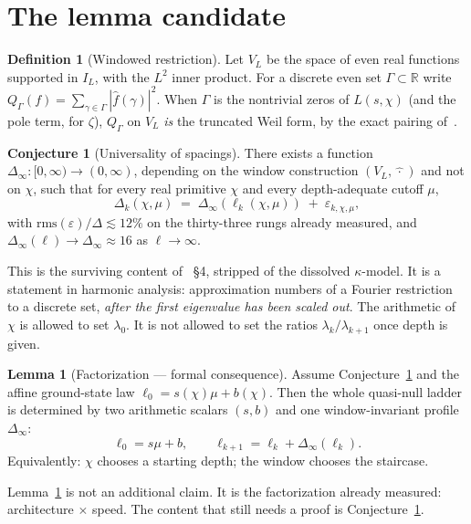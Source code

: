 \documentclass[10pt]{article}
\theoremstyle{definition}
\newtheorem{definition}{Definition}
\newtheorem{lemma}{Lemma}
\newtheorem{conjecture}{Conjecture}
\newcommand{\R}{\mathbb{R}}
\begin{document}
\section{The lemma candidate}

\begin{definition}[Windowed restriction]
Let $V_L$ be the space of even real functions supported in $I_L$,
with the $L^2$ inner product. For a discrete even set
$\Gamma\subset\R$ write
$Q_\Gamma(f)=\sum_{\gamma\in\Gamma}|\hat f(\gamma)|^2$.
When $\Gamma$ is the nontrivial zeros of $L(s,\chi)$ (and the pole
term, for $\zeta$), $Q_\Gamma$ on $V_L$ \emph{is} the truncated Weil
form, by the exact pairing of~\cite{Quorum}.
\end{definition}

\begin{conjecture}[Universality of spacings]\label{conj:univ}
There exists a function $\Delta_\infty:[0,\infty)\to(0,\infty)$,
depending on the window construction $(V_L,\widehat{\,\cdot\,})$ and
not on $\chi$, such that for every real primitive $\chi$ and every
depth-adequate cutoff $\mu$,
\[
\Delta_k(\chi,\mu)
\;=\;
\Delta_\infty(\ell_k(\chi,\mu)) \;+\; \varepsilon_{k,\chi,\mu},
\]
with $\mathrm{rms}(\varepsilon)/\Delta \lesssim 12\%$ on the thirty-three
rungs already measured, and $\Delta_\infty(\ell)\to\Delta_\infty\approx16$
as $\ell\to\infty$.
\end{conjecture}

This is the surviving content of~\cite{Depth} \S4, stripped of the
dissolved $\kappa$-model. It is a statement in harmonic analysis:
approximation numbers of a Fourier restriction to a discrete set,
\emph{after the first eigenvalue has been scaled out}. The arithmetic
of $\chi$ is allowed to set $\lambda_0$. It is not allowed to set the
ratios $\lambda_k/\lambda_{k+1}$ once depth is given.

\begin{lemma}[Factorization --- formal consequence]\label{lem:fact}
Assume Conjecture~\ref{conj:univ} and the affine ground-state law
$\ell_0=s(\chi)\mu+b(\chi)$. Then the whole quasi-null ladder is
determined by two arithmetic scalars $(s,b)$ and one window-invariant
profile $\Delta_\infty$:
\[
\ell_0=s\mu+b,\qquad
\ell_{k+1}=\ell_k+\Delta_\infty(\ell_k).
\]
Equivalently: $\chi$ chooses a starting depth; the window chooses the
staircase.
\end{lemma}

Lemma~\ref{lem:fact} is not an additional claim. It is the
factorization already measured: architecture $\times$ speed. The
content that still needs a proof is Conjecture~\ref{conj:univ}.
\end{document}
